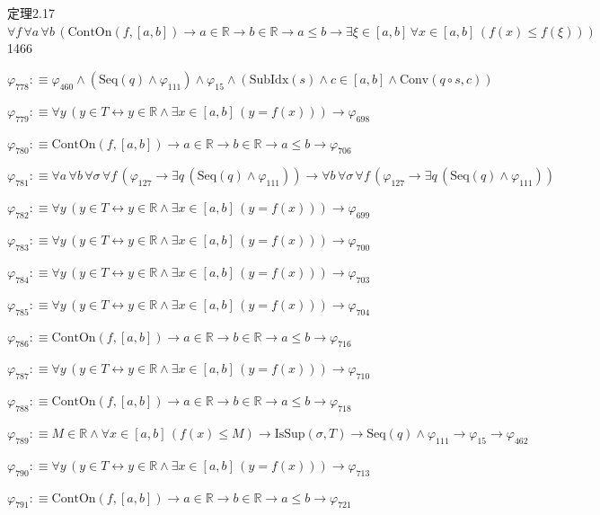 \begin{fullproof}{定理2.17}{$\forall f\,\forall a\,\forall b\,(\mathrm{ContOn}(f,[a,b]) \to a \in \mathbb{R} \to b \in \mathbb{R} \to a \leq b \to \exists \xi \in [a,b]\,\forall x \in [a,b]\,(f(x) \leq f(\xi)))$}{1466}
\begin{abbrevlist}
\item $\varphi_{778} :\equiv \varphi_{460} \land (\mathrm{Seq}(q) \land \varphi_{111}) \land \varphi_{15} \land (\mathrm{SubIdx}(s) \land c \in [a,b] \land \mathrm{Conv}(q \circ s,c))$
\item $\varphi_{779} :\equiv \forall y\,(y \in T \leftrightarrow y \in \mathbb{R} \land \exists x \in [a,b]\,(y = f(x))) \to \varphi_{698}$
\item $\varphi_{780} :\equiv \mathrm{ContOn}(f,[a,b]) \to a \in \mathbb{R} \to b \in \mathbb{R} \to a \leq b \to \varphi_{706}$
\item $\varphi_{781} :\equiv \forall a\,\forall b\,\forall \sigma\,\forall f\,(\varphi_{127} \to \exists q\,(\mathrm{Seq}(q) \land \varphi_{111})) \to \forall b\,\forall \sigma\,\forall f\,(\varphi_{127} \to \exists q\,(\mathrm{Seq}(q) \land \varphi_{111}))$
\item $\varphi_{782} :\equiv \forall y\,(y \in T \leftrightarrow y \in \mathbb{R} \land \exists x \in [a,b]\,(y = f(x))) \to \varphi_{699}$
\item $\varphi_{783} :\equiv \forall y\,(y \in T \leftrightarrow y \in \mathbb{R} \land \exists x \in [a,b]\,(y = f(x))) \to \varphi_{700}$
\item $\varphi_{784} :\equiv \forall y\,(y \in T \leftrightarrow y \in \mathbb{R} \land \exists x \in [a,b]\,(y = f(x))) \to \varphi_{703}$
\item $\varphi_{785} :\equiv \forall y\,(y \in T \leftrightarrow y \in \mathbb{R} \land \exists x \in [a,b]\,(y = f(x))) \to \varphi_{704}$
\item $\varphi_{786} :\equiv \mathrm{ContOn}(f,[a,b]) \to a \in \mathbb{R} \to b \in \mathbb{R} \to a \leq b \to \varphi_{716}$
\item $\varphi_{787} :\equiv \forall y\,(y \in T \leftrightarrow y \in \mathbb{R} \land \exists x \in [a,b]\,(y = f(x))) \to \varphi_{710}$
\item $\varphi_{788} :\equiv \mathrm{ContOn}(f,[a,b]) \to a \in \mathbb{R} \to b \in \mathbb{R} \to a \leq b \to \varphi_{718}$
\item $\varphi_{789} :\equiv M \in \mathbb{R} \land \forall x \in [a,b]\,(f(x) \leq M) \to \mathrm{IsSup}(\sigma,T) \to \mathrm{Seq}(q) \land \varphi_{111} \to \varphi_{15} \to \varphi_{462}$
\item $\varphi_{790} :\equiv \forall y\,(y \in T \leftrightarrow y \in \mathbb{R} \land \exists x \in [a,b]\,(y = f(x))) \to \varphi_{713}$
\item $\varphi_{791} :\equiv \mathrm{ContOn}(f,[a,b]) \to a \in \mathbb{R} \to b \in \mathbb{R} \to a \leq b \to \varphi_{721}$

\end{abbrevlist}
\end{fullproof}
